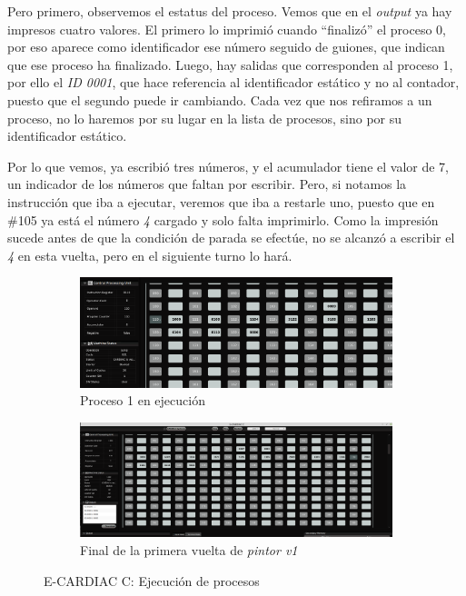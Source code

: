 \documentclass[letterpaper,12pt,oneside]{book}
\begin{document}
        Pero primero, observemos el estatus del proceso. Vemos que en
		el \textit{output} ya hay impresos cuatro valores. El primero lo imprimió cuando ``finalizó'' el proceso 0, por eso
		aparece como identificador ese 
		número
		seguido de guiones, que indican que ese proceso ha finalizado. Luego, hay salidas que corresponden al proceso 1, por ello el \textit{ID 0001}, 
		que hace
		referencia al identificador estático y no al contador, puesto que el segundo puede ir cambiando. Cada vez que nos refiramos a un proceso, no lo 
		haremos por su lugar en la lista de procesos, sino por su identificador estático.

  
        Por lo que vemos, ya escribió tres números, y el acumulador
		tiene el valor de 7, un indicador de los números que faltan por escribir. Pero, si notamos la instrucción que iba a ejecutar, veremos que iba a 
		restarle uno, puesto que en \#105 ya está el número \textit{4} cargado y solo falta imprimirlo. Como la impresión sucede antes de que la 
		condición de 
		parada se efectúe, no se alcanzó a escribir el \textit{4} en esta vuelta, pero en el siguiente turno lo hará.


		\begin{figure}[h]
            \centering
            \begin{subfigure}[b]{0.50\textwidth}
                \centering
                \includegraphics[scale=0.58,angle=90]{media/CARDIACC/proceso1Exec1P1.png}
                \caption{Proceso 1 en ejecución}
                \label{fig:proceso1ExecP1}
            \end{subfigure}
            \hfill
            \begin{subfigure}[b]{0.45\textwidth}
                \centering
                \includegraphics[scale=0.37,angle=90]{media/CARDIACC/proceso1Exec1P1Final.png}
                \caption{Final de la primera vuelta de \textit{pintor v1}}
                \label{fig:proceso1Exec1P1Final}
            \end{subfigure}
            \caption{E-CARDIAC C: Ejecución de procesos}
            \label{fig:side_by_side}
        \end{figure}
        
\end{document}
